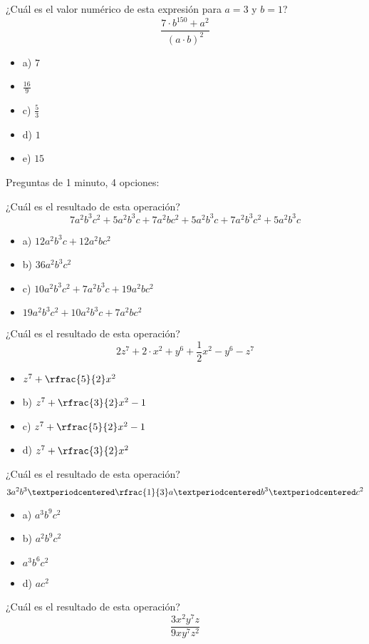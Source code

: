 \newpreg ¿Cuál es el valor numérico de esta expresión para $a=3$ y $b=1$?
\[
	\frac{7·b^{150}+a^2}{(a·b)^2}
\]

\begin{itemize}
	\item a) $7$
	\item {} $\frac{16}{9}$
	\item c) $\frac{5}{3}$
	\item d) $1$
	\item e) $15$
\end{itemize}


\newbloq Preguntas de 1 minuto, 4 opciones:

\newpreg ¿Cuál es el resultado de esta operación?
\[
	7a^2b^3c^2 + 5a^2b^3c  + 7a^2bc^2 + 5a^2b^3c + 7a^2b^3c^2 + 5a^2b^3c 
\]

\begin{itemize}
	\item a) $12a^2b^3c + 12a^2bc^2$
	\item b) $36a^2b^3c^2$
	\item c) $10a^2b^3c^2 + 7a^2b^3c + 19a^2bc^2$
	\item {} $19a^2b^3c^2 + 10a^2b^3c + 7a^2bc^2$
\end{itemize}

\newpreg ¿Cuál es el resultado de esta operación?
\[
	2z^7 + 2·x^2 + y^6 + \frac{1}{2}x^2 - y^6 -z^7
\]

\begin{itemize}
	\item {} $z^7 + \rfrac{5}{2}x^2$
	\item b) $z^7 + \rfrac{3}{2}x^2 - 1$
	\item c) $z^7 + \rfrac{5}{2}x^2 - 1$
	\item d) $z^7 + \rfrac{3}{2}x^2$
\end{itemize}


\newpreg ¿Cuál es el resultado de esta operación?
\[
	3a^2b^3 · \rfrac{1}{3}a·b^3·c^2
\]

\begin{itemize}
	\item a) $a^3b^9c^2$
	\item b) $a^2b^9c^2$
	\item {} $a^3b^6c^2$
	\item d) $ac^2$
\end{itemize}


\newpreg ¿Cuál es el resultado de esta operación?
\[
	\frac{3x^2y^7z}{9xy^7z^2}
\]

